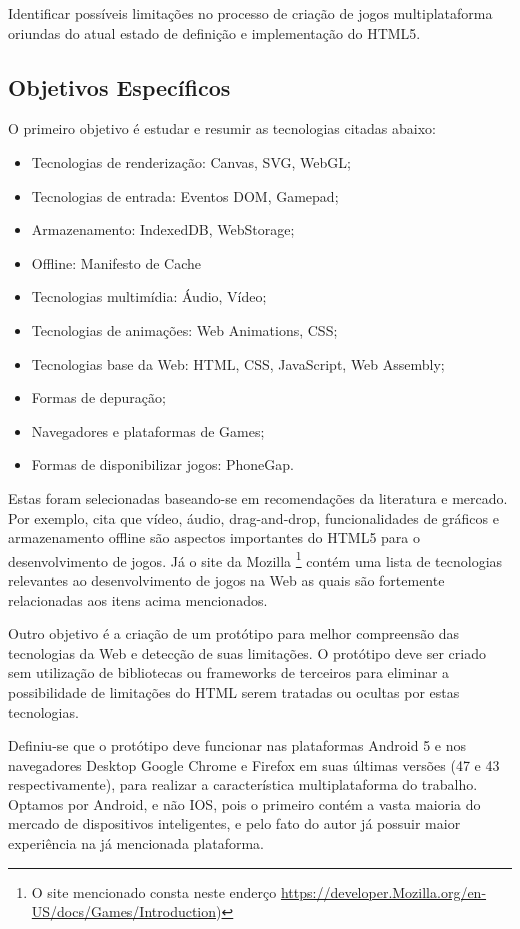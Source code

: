 Identificar possíveis limitações no processo de criação de
jogos multiplataforma oriundas do atual estado de definição e
implementação do HTML5.


\subsection{Objetivos Específicos}

\noindent O primeiro objetivo é estudar e resumir as tecnologias citadas abaixo:

\begin{itemize}
\item Tecnologias de renderização: Canvas, SVG, WebGL;
\item Tecnologias de entrada: Eventos DOM, Gamepad;
\item Armazenamento: IndexedDB, WebStorage;
\item Offline: Manifesto de Cache
\item Tecnologias multimídia: Áudio, Vídeo;
\item Tecnologias de animações: Web Animations, CSS;
\item Tecnologias base da Web: HTML, CSS, JavaScript, Web Assembly;
\item Formas de depuração;
\item Navegadores e plataformas de Games;
\item Formas de disponibilizar jogos: PhoneGap.
\end{itemize}

Estas foram selecionadas baseando-se em recomendações da literatura
e mercado. Por exemplo, \citet{browserGamesTechnologyAndFuture}
cita que vídeo, áudio, drag-and-drop, funcionalidades de
gráficos e armazenamento offline são aspectos importantes do
HTML5 para o desenvolvimento de jogos. Já o site da Mozilla
\footnote{O site mencionado consta neste enderço \url{https://developer.Mozilla.org/en-US/docs/Games/Introduction})}
contém uma lista de tecnologias relevantes ao desenvolvimento
de jogos na Web as quais são fortemente relacionadas aos itens acima
mencionados.

Outro objetivo é a criação de um protótipo para melhor compreensão
das tecnologias da Web e detecção de suas limitações. O protótipo
deve ser criado sem utilização de bibliotecas ou frameworks de
terceiros para eliminar a possibilidade de limitações do HTML serem
tratadas ou ocultas por estas tecnologias.

Definiu-se que o protótipo deve funcionar nas plataformas Android
5 e nos navegadores Desktop Google Chrome e Firefox em suas últimas
versões (47 e 43 respectivamente), para realizar a característica
multiplataforma do trabalho. Optamos por Android, e não IOS, pois
o primeiro contém a vasta maioria do mercado de dispositivos
inteligentes, e pelo fato do autor já possuir maior experiência na já mencionada
plataforma.

